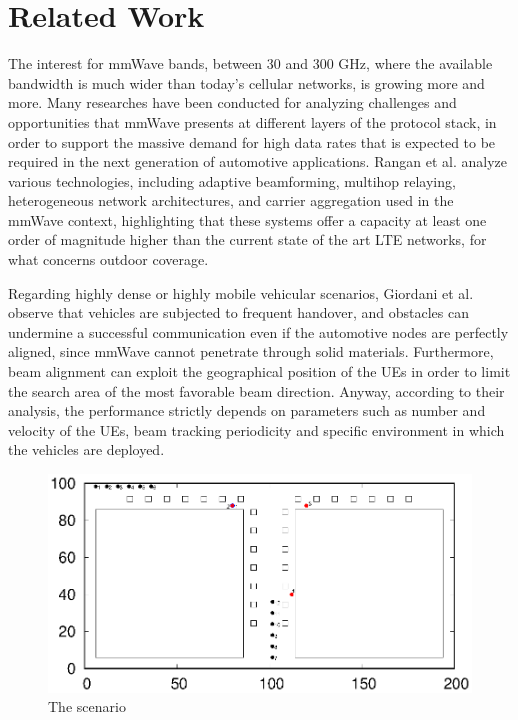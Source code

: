 \documentclass[conference,10pt]{IEEEtran}
\begin{document}
\section{Related Work}\label{sec:sota}

The interest for mmWave bands, between 30 and 300 GHz, where the available bandwidth is much wider than today's cellular networks, is growing more and more. Many researches have been conducted for analyzing challenges and opportunities that mmWave presents at different layers of the protocol stack, in order to support the massive demand for high data rates that is expected to be required in the next generation of automotive applications.
Rangan et al. \cite{mmwpac} analyze various technologies, including adaptive beamforming, multihop relaying, heterogeneous network architectures, and carrier aggregation used in the mmWave context, highlighting that these systems offer a capacity at least one order of magnitude higher than the current state of the art LTE networks, for what concerns outdoor coverage.

Regarding highly dense or highly mobile vehicular scenarios, Giordani et al. \cite{mmvehicle} observe that vehicles are subjected to frequent handover, and obstacles can undermine a successful communication even if the automotive nodes are perfectly aligned, since mmWave cannot penetrate through solid materials. Furthermore, beam alignment can exploit the geographical position of the UEs in order to limit the search area of the most favorable beam direction. Anyway, according to their analysis, the performance strictly depends on parameters such as number and velocity of the UEs, beam tracking periodicity and specific environment in which the vehicles are deployed.

\begin{figure}[ht]
	\begin{center}    
		\includegraphics[width=15cm, keepaspectratio]{images/scenario.eps}
		\caption{The scenario}
		\label{fig:scenario}
	\end{center}
\end{figure}
\end{document}
